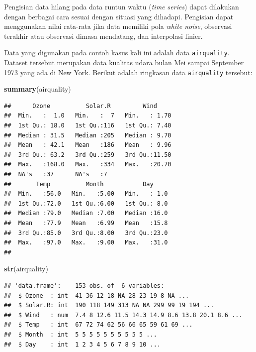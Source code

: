 \documentclass[
]{book}
\newenvironment{Shaded}{\begin{snugshade}}{\end{snugshade}}
\newcommand{\FunctionTok}[1]{\textcolor[rgb]{0.13,0.29,0.53}{\textbf{#1}}}
\newcommand{\NormalTok}[1]{#1}
\theoremstyle{definition}
\theoremstyle{definition}
\theoremstyle{definition}
\theoremstyle{definition}
\theoremstyle{remark}
\begin{document}
Pengisian data hilang pada data runtun waktu (\emph{time series}) dapat dilakukan dengan berbagai cara sesuai dengan situasi yang dihadapi. Pengisian dapat menggunakan nilai rata-rata jika data memiliki pola \emph{white noise}, observasi terakhir atau observasi dimasa mendatang, dan interpolasi linier.

Data yang digunakan pada contoh kasus kali ini adalah data \texttt{airquality}. Dataset tersebut merupakan data kualitas udara bulan Mei sampai September 1973 yang ada di New York. Berikut adalah ringkasan data \texttt{airquality} tersebut:

\begin{Shaded}
\begin{Highlighting}[]
\FunctionTok{summary}\NormalTok{(airquality)}
\end{Highlighting}
\end{Shaded}

\begin{verbatim}
##      Ozone          Solar.R         Wind      
##  Min.   :  1.0   Min.   :  7   Min.   : 1.70  
##  1st Qu.: 18.0   1st Qu.:116   1st Qu.: 7.40  
##  Median : 31.5   Median :205   Median : 9.70  
##  Mean   : 42.1   Mean   :186   Mean   : 9.96  
##  3rd Qu.: 63.2   3rd Qu.:259   3rd Qu.:11.50  
##  Max.   :168.0   Max.   :334   Max.   :20.70  
##  NA's   :37      NA's   :7                    
##       Temp          Month           Day      
##  Min.   :56.0   Min.   :5.00   Min.   : 1.0  
##  1st Qu.:72.0   1st Qu.:6.00   1st Qu.: 8.0  
##  Median :79.0   Median :7.00   Median :16.0  
##  Mean   :77.9   Mean   :6.99   Mean   :15.8  
##  3rd Qu.:85.0   3rd Qu.:8.00   3rd Qu.:23.0  
##  Max.   :97.0   Max.   :9.00   Max.   :31.0  
## 
\end{verbatim}

\begin{Shaded}
\begin{Highlighting}[]
\FunctionTok{str}\NormalTok{(airquality)}
\end{Highlighting}
\end{Shaded}

\begin{verbatim}
## 'data.frame':    153 obs. of  6 variables:
##  $ Ozone  : int  41 36 12 18 NA 28 23 19 8 NA ...
##  $ Solar.R: int  190 118 149 313 NA NA 299 99 19 194 ...
##  $ Wind   : num  7.4 8 12.6 11.5 14.3 14.9 8.6 13.8 20.1 8.6 ...
##  $ Temp   : int  67 72 74 62 56 66 65 59 61 69 ...
##  $ Month  : int  5 5 5 5 5 5 5 5 5 5 ...
##  $ Day    : int  1 2 3 4 5 6 7 8 9 10 ...
\end{verbatim}
\end{document}
